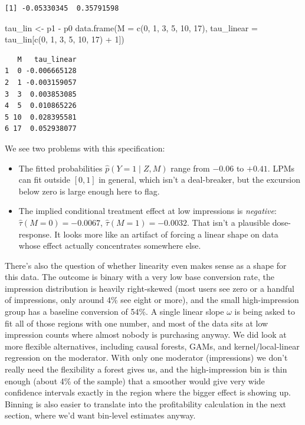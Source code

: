 \documentclass[
  letterpaper,
  DIV=11,
  numbers=noendperiod]{scrartcl}
\newenvironment{Shaded}{\begin{snugshade}}{\end{snugshade}}
\newcommand{\AttributeTok}[1]{\textcolor[rgb]{0.40,0.45,0.13}{#1}}
\newcommand{\DecValTok}[1]{\textcolor[rgb]{0.68,0.00,0.00}{#1}}
\newcommand{\FunctionTok}[1]{\textcolor[rgb]{0.28,0.35,0.67}{#1}}
\newcommand{\NormalTok}[1]{\textcolor[rgb]{0.00,0.23,0.31}{#1}}
\newcommand{\OtherTok}[1]{\textcolor[rgb]{0.00,0.23,0.31}{#1}}
\newcommand{\SpecialCharTok}[1]{\textcolor[rgb]{0.37,0.37,0.37}{#1}}
\providecommand{\tightlist}{%
  \setlength{\itemsep}{0pt}\setlength{\parskip}{0pt}}
\begin{document}
\begin{verbatim}
[1] -0.05330345  0.35791598
\end{verbatim}

\begin{Shaded}
\begin{Highlighting}[]
\NormalTok{tau\_lin }\OtherTok{\textless{}{-}}\NormalTok{ p1 }\SpecialCharTok{{-}}\NormalTok{ p0}
\FunctionTok{data.frame}\NormalTok{(}\AttributeTok{M =} \FunctionTok{c}\NormalTok{(}\DecValTok{0}\NormalTok{, }\DecValTok{1}\NormalTok{, }\DecValTok{3}\NormalTok{, }\DecValTok{5}\NormalTok{, }\DecValTok{10}\NormalTok{, }\DecValTok{17}\NormalTok{),}
           \AttributeTok{tau\_linear =}\NormalTok{ tau\_lin[}\FunctionTok{c}\NormalTok{(}\DecValTok{0}\NormalTok{, }\DecValTok{1}\NormalTok{, }\DecValTok{3}\NormalTok{, }\DecValTok{5}\NormalTok{, }\DecValTok{10}\NormalTok{, }\DecValTok{17}\NormalTok{) }\SpecialCharTok{+} \DecValTok{1}\NormalTok{])}
\end{Highlighting}
\end{Shaded}

\begin{verbatim}
   M   tau_linear
1  0 -0.006665128
2  1 -0.003159057
3  3  0.003853085
4  5  0.010865226
5 10  0.028395581
6 17  0.052938077
\end{verbatim}

We see two problems with this specification:

\begin{itemize}
\tightlist
\item
  The fitted probabilities \(\hat p(Y=1 \mid Z, M)\) range from
  \(-0.06\) to \(+0.41\). LPMs can fit outside \([0,1]\) in general,
  which isn't a deal-breaker, but the excursion below zero is large
  enough here to flag.
\item
  The implied conditional treatment effect at low impressions is
  \emph{negative}: \(\hat\tau(M=0) = -0.0067\),
  \(\hat\tau(M=1) = -0.0032\). That isn't a plausible dose-response. It
  looks more like an artifact of forcing a linear shape on data whose
  effect actually concentrates somewhere else.
\end{itemize}

There's also the question of whether linearity even makes sense as a
shape for this data. The outcome is binary with a very low base
conversion rate, the impression distribution is heavily right-skewed
(most users see zero or a handful of impressions, only around 4\% see
eight or more), and the small high-impression group has a baseline
conversion of 54\%. A single linear slope \(\omega\) is being asked to
fit all of those regions with one number, and most of the data sits at
low impression counts where almost nobody is purchasing anyway. We did
look at more flexible alternatives, including causal forests, GAMs, and
kernel/local-linear regression on the moderator. With only one moderator
(impressions) we don't really need the flexibility a forest gives us,
and the high-impression bin is thin enough (about 4\% of the sample)
that a smoother would give very wide confidence intervals exactly in the
region where the bigger effect is showing up. Binning is also easier to
translate into the profitability calculation in the next section, where
we'd want bin-level estimates anyway.
\end{document}
